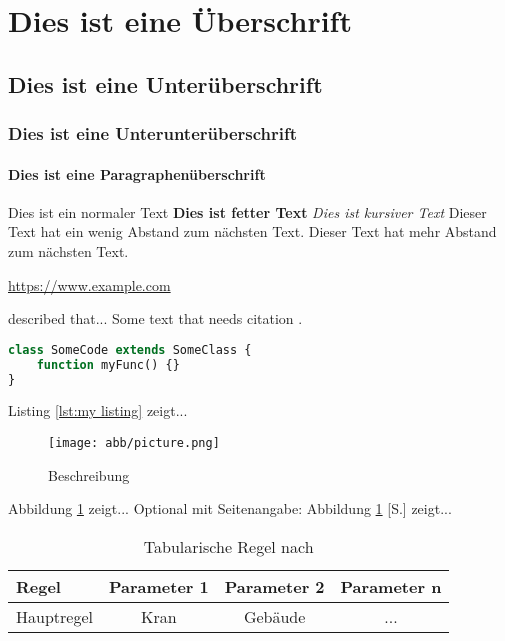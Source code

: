 \section{Dies ist eine Überschrift}
\subsection{Dies ist eine Unterüberschrift}
\subsubsection{Dies ist eine Unterunterüberschrift}
\paragraph{Dies ist eine Paragraphenüberschrift}
Dies ist ein normaler Text
\textbf{Dies ist fetter Text}
\textit{Dies ist kursiver Text}
\medskip
Dieser Text hat ein wenig Abstand zum nächsten Text.
\bigskip
Dieser Text hat mehr Abstand zum nächsten Text.

\url{https://www.example.com}

\textcite{citation_key} described that...
Some text that needs citation \parencite{citation_key}.

\begin{lstlisting}[frame=htrbl, caption={Caption Here}, label={lst:my listing}, language=php]
class SomeCode extends SomeClass {
    function myFunc() {}
}
\end{lstlisting}

Listing \ref{lst:my listing} zeigt...

\begin{figure}[h]
\texttt{[image: abb/picture.png]}
\centering
\caption{Beschreibung \parencite{citation_key}}
\label{fig:my fig}
\end{figure}

Abbildung \ref{fig:my fig} zeigt...
Optional mit Seitenangabe: Abbildung \ref{fig:my fig} [S.\pageref{fig:my fig}] zeigt...


\begin{table}[!h]
\begin{center}
    \begin{tabular}{ | l | c | c | c | }
      \hline
      Regel & Parameter 1 & Parameter 2 & Parameter n \\ \hline \hline
      Hauptregel & Kran & Gebäude & ... \\ \hline
    \end{tabular}
\caption{Tabularische Regel nach \textcite{citation_key}}
\label{tab:my table}
\end{center}
\end{table}

